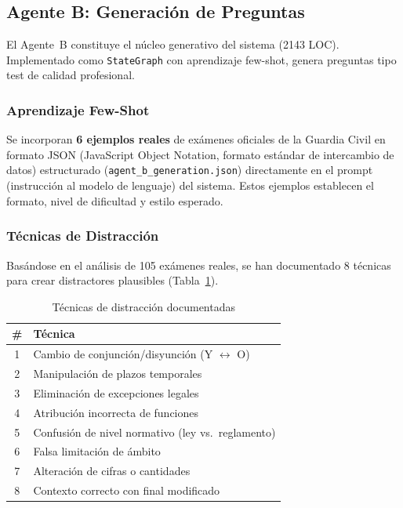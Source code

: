 \documentclass[10pt,twocolumn,letterpaper]{article}
\begin{document}
\subsection{Agente B: Generaci\'on de Preguntas}

El Agente~B constituye el n\'ucleo generativo del sistema (2143 LOC). Implementado como
\texttt{StateGraph} con aprendizaje few-shot, genera preguntas tipo test
de calidad profesional.

\subsubsection{Aprendizaje Few-Shot}
Se incorporan \textbf{6 ejemplos reales} de ex\'amenes oficiales de la Guardia Civil
en formato JSON (JavaScript Object Notation, formato est\'andar de intercambio de datos)
estructurado (\texttt{agent\_b\_generation.json}) directamente en el prompt (instrucci\'on
al modelo de lenguaje) del sistema. Estos ejemplos establecen el formato, nivel de dificultad y
estilo esperado.

\subsubsection{T\'ecnicas de Distracci\'on}
Bas\'andose en el an\'alisis de 105 ex\'amenes reales, se han documentado 8 t\'ecnicas
para crear distractores plausibles (Tabla~\ref{tab:distractors}).

\begin{table}[H]
\centering
\caption{T\'ecnicas de distracci\'on documentadas}
\label{tab:distractors}
\scriptsize
\begin{tabularx}{\columnwidth}{cX}
\toprule
\textbf{\#} & \textbf{T\'ecnica} \\
\midrule
1 & Cambio de conjunci\'on/disyunci\'on (Y $\leftrightarrow$ O) \\
2 & Manipulaci\'on de plazos temporales \\
3 & Eliminaci\'on de excepciones legales \\
4 & Atribuci\'on incorrecta de funciones \\
5 & Confusi\'on de nivel normativo (ley vs.\ reglamento) \\
6 & Falsa limitaci\'on de \'ambito \\
7 & Alteraci\'on de cifras o cantidades \\
8 & Contexto correcto con final modificado \\
\bottomrule
\end{tabularx}
\end{table}
\end{document}
